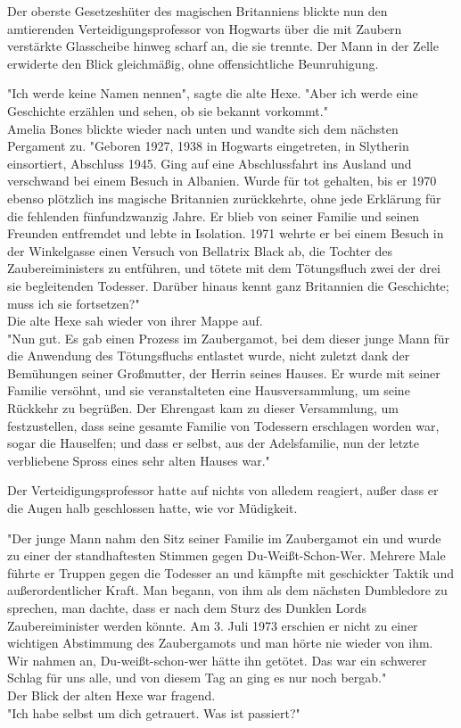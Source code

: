 {Der oberste Gesetzeshüter des magischen Britanniens blickte nun den amtierenden Verteidigungsprofessor von Hogwarts über die mit Zaubern verstärkte Glasscheibe hinweg scharf an, die sie trennte. Der Mann in der Zelle erwiderte den Blick gleichmäßig, ohne offensichtliche Beunruhigung.

"Ich werde keine Namen nennen", sagte die alte Hexe. "Aber ich werde eine Geschichte erzählen und sehen, ob sie bekannt vorkommt."\\ Amelia Bones blickte wieder nach unten und wandte sich dem nächsten Pergament zu. "Geboren 1927, 1938 in Hogwarts eingetreten, in Slytherin einsortiert, Abschluss 1945. Ging auf eine Abschlussfahrt ins Ausland und verschwand bei einem Besuch in Albanien. Wurde für tot gehalten, bis er 1970 ebenso plötzlich ins magische Britannien zurückkehrte, ohne jede Erklärung für die fehlenden fünfundzwanzig Jahre. Er blieb von seiner Familie und seinen Freunden entfremdet und lebte in Isolation. 1971 wehrte er bei einem Besuch in der Winkelgasse einen Versuch von Bellatrix Black ab, die Tochter des Zaubereiministers zu entführen, und tötete mit dem Tötungsfluch zwei der drei sie begleitenden Todesser. Darüber hinaus kennt ganz Britannien die Geschichte; muss ich sie fortsetzen?"\\ Die alte Hexe sah wieder von ihrer Mappe auf.\\ "Nun gut. Es gab einen Prozess im Zaubergamot, bei dem dieser junge Mann für die Anwendung des Tötungsfluchs entlastet wurde, nicht zuletzt dank der Bemühungen seiner Großmutter, der Herrin seines Hauses. Er wurde mit seiner Familie versöhnt, und sie veranstalteten eine Hausversammlung, um seine Rückkehr zu begrüßen. Der Ehrengast kam zu dieser Versammlung, um festzustellen, dass seine gesamte Familie von Todessern erschlagen worden war, sogar die Hauselfen; und dass er selbst, aus der Adelsfamilie, nun der letzte verbliebene Spross eines sehr alten Hauses war."

Der Verteidigungsprofessor hatte auf nichts von alledem reagiert, außer dass er die Augen halb geschlossen hatte, wie vor Müdigkeit.

"Der junge Mann nahm den Sitz seiner Familie im Zaubergamot ein und wurde zu einer der standhaftesten Stimmen gegen Du-Weißt-Schon-Wer. Mehrere Male führte er Truppen gegen die Todesser an und kämpfte mit geschickter Taktik und außerordentlicher Kraft. Man begann, von ihm als dem nächsten Dumbledore zu sprechen, man dachte, dass er nach dem Sturz des Dunklen Lords Zaubereiminister werden könnte. Am 3. Juli 1973 erschien er nicht zu einer wichtigen Abstimmung des Zaubergamots und man hörte nie wieder von ihm. Wir nahmen an, Du-weißt-schon-wer hätte ihn getötet. Das war ein schwerer Schlag für uns alle, und von diesem Tag an ging es nur noch bergab."\\ Der Blick der alten Hexe war fragend.\\ "Ich habe selbst um dich getrauert. Was ist passiert?"

}
